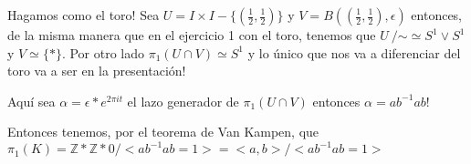 \documentclass[11pt]{article}
\newcommand{\R}{{\mathbb{R}}}
\newenvironment{proof}[1][Demostraci\'on]{\begin{trivlist}
\item[\hskip \labelsep {\bfseries #1}]}{\end{trivlist}}
\newcommand{\qed}{\nobreak \ifvmode \relax \else
      \ifdim\lastskip<1.5em \hskip-\lastskip
      \hskip1.5em plus0em minus0.5em \fi \nobreak
      \vrule height0.75em width0.5em depth0.25em\fi}
\newcommand{\Z}{\mathbb{Z}}
\def \be{\begin{enumerate}}
\def \en{\end{enumerate}}
\begin{document}
\begin{enumerate}
\begin{proof}

Hagamos como el toro! Sea $U = I \times I -\{(\frac{1}{2},\frac{1}{2})\}$ y $V= B((\frac{1}{2},\frac{1}{2}),\epsilon)$ entonces, de la misma manera que en el ejercicio 1 con el toro, tenemos que $U \ / \mathord{\sim} \simeq S^1 \vee S^1$ y $V \simeq \{*\}$. Por otro lado $\pi_1(U \cap V) \simeq S^1$ y lo \'unico que nos va a diferenciar del toro va a ser en la presentaci\'on!

Aqu\'i sea $\alpha= \epsilon * e^{2 \pi i t}$ el lazo generador de $\pi_1(U \cap V)$ entonces $\alpha=ab^{-1}ab$!

Entonces tenemos, por el teorema de Van Kampen, que $\pi_1(K)= \Z * \Z * 0 / <ab^{-1}ab = 1> = <a,b> / <ab^{-1}ab = 1>$ \qed

\end{proof}




%
%
%
%
%
%
%
%

%
%
%


\end{enumerate}
\end{document}
